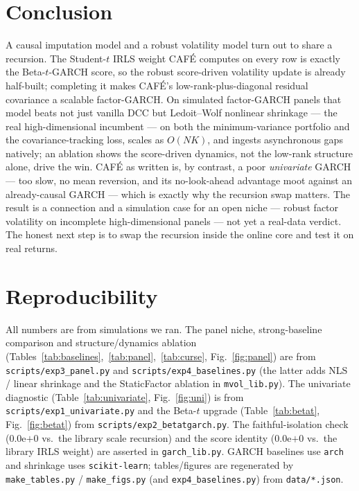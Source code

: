 \documentclass[10pt,twocolumn]{article}
\newcommand{\cafe}{CAF\'E}
\begin{document}
\section{Conclusion}
A causal imputation model and a robust volatility model turn out to share a recursion.
The Student-$t$ IRLS weight \cafe{} computes on every row is exactly the Beta-$t$-GARCH
score, so the robust score-driven volatility update is already half-built; completing it
makes \cafe{}'s low-rank-plus-diagonal residual covariance a scalable factor-GARCH. On
simulated factor-GARCH panels that model beats not just vanilla DCC but Ledoit--Wolf
nonlinear shrinkage --- the real high-dimensional incumbent --- on both the
minimum-variance portfolio and the covariance-tracking loss, scales as $O(NK)$, and ingests
asynchronous gaps natively; an ablation shows the score-driven dynamics, not the low-rank
structure alone, drive the win. \cafe{} as written is, by contrast, a poor \emph{univariate}
GARCH --- too slow, no mean reversion, and its no-look-ahead advantage moot against an
already-causal GARCH --- which is exactly why the recursion swap matters. The result is a
connection and a simulation case for an open niche --- robust factor volatility on
incomplete high-dimensional panels --- not yet a real-data verdict. The honest next step is
to swap the recursion inside the online core and test it on real returns.

\section*{Reproducibility}
All numbers are from simulations we ran. The panel niche, strong-baseline comparison and
structure/dynamics ablation (Tables~\ref{tab:baselines},~\ref{tab:panel},~\ref{tab:curse},
Fig.~\ref{fig:panel}) are from \texttt{scripts/exp3\_panel.py} and
\texttt{scripts/exp4\_baselines.py} (the latter adds NLS / linear shrinkage and the
StaticFactor ablation in \texttt{mvol\_lib.py}). The univariate diagnostic
(Table~\ref{tab:univariate}, Fig.~\ref{fig:uni}) is from \texttt{scripts/exp1\_univariate.py}
and the Beta-$t$ upgrade (Table~\ref{tab:betat}, Fig.~\ref{fig:betat}) from
\texttt{scripts/exp2\_betatgarch.py}. The faithful-isolation check ($0.0$e$+$0 vs.\ the
library scale recursion) and the score identity ($0.0$e$+$0 vs.\ the library IRLS weight)
are asserted in \texttt{garch\_lib.py}. GARCH baselines use \texttt{arch}~\cite{sheppard_arch}
and shrinkage uses \texttt{scikit-learn}; tables/figures are regenerated by
\texttt{make\_tables.py} / \texttt{make\_figs.py} (and \texttt{exp4\_baselines.py}) from
\texttt{data/*.json}.
\end{document}

